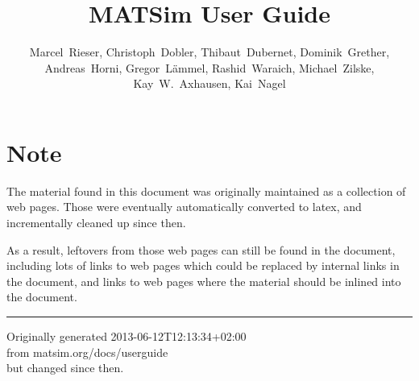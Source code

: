 \documentclass[a4paper,11pt]{report}
\newcommand{\NextFile}[1]{}
\begin{document}
\NextFile{index.html}

\title{MATSim User Guide}

\author{%
Marcel~Rieser, %
%
Christoph~Dobler,
Thibaut~Dubernet,
Dominik~Grether,
Andreas~Horni, 
Gregor~Lämmel,
Rashid~Waraich,
Michael~Zilske,
%
Kay~W.~Axhausen, %
Kai~Nagel %
}



\vfill\eject

\section*{Note}

The material found in this document was originally maintained as a collection of web pages.  Those were eventually automatically converted to latex, and incrementally cleaned up since then.  

As a result, leftovers from those web pages can still be found in the document, including lots of links to web pages which could be replaced by internal links in the document, and links to web pages where the material should be inlined into the document.
\\
\hrule

Originally generated 2013-06-12T12:13:34+02:00
\\from matsim.org/docs/userguide
\\but changed since then.



\vfill\eject

\tableofcontents











%



\vfill\eject
\end{document}
